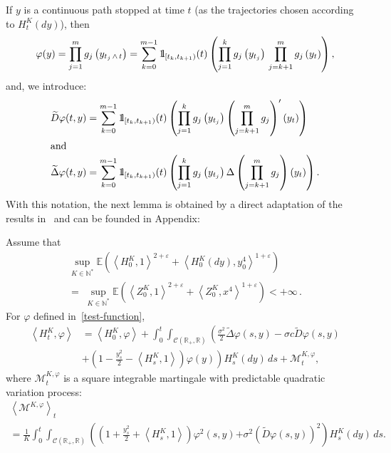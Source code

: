 \documentclass[AHL,Unicode,longabstracts,published]{cedram}
\newcommand{\Co}{\mathcal{C}}
\newcommand{\Mo}{\mathcal{M}}
\newcommand*\N{\mathbb{N}}
\newcommand*\R{\mathbb{R}}
\newcommand*\E{\mathbb{E}}
\newcommand*\ind{{\mathchoice {\rm 1\mskip-4mu l} {\rm 1\mskip-4mu l} {\rm 1\mskip-4.5mu l} {\rm 1\mskip-5mu l}}}
\begin{document}
If $y$ is a continuous path stopped at time $t$ (as the trajectories chosen according to $H^K_{t}(dy)$), then
\[
\varphi(y)=\prod_{j=1}^m g_{j}\left(y_{t_{j}\,\wedge\, t} \right) = \sum_{k=0}^{m-1}\ind_{\left[t_k, t_{k+1}\right)}(t)\left(\prod_{j=1}^k g_j\left(y_{t_j}\right) \, \prod_{j=k+1}^m g_j\left(y_t\right)\right),
\]
and, we introduce:
\begin{align}
\widetilde{D}\varphi(t,y) &= \sum_{k=0}^{m-1}\ind_{\left[t_k, t_{k+1}\right)}(t)\left(\prod_{j=1}^k g_j\left(y_{t_j}\right) \left(\prod_{j=k+1}^m g_j\right)'\left(y_t\right)\right)\label{derivee}
\\
\intertext{and}
\widetilde{\Delta}\varphi(t,y) &= \sum_{k=0}^{m-1}\ind_{\left[t_k, t_{k+1}\right)}(t)\left(\prod_{j=1}^k g_j\left(y_{t_j}\right) \Delta\left(\prod_{j=k+1}^m g_j\right)\left(y_t\right)\right).\label{laplacien}
\end{align}
With this notation, the next lemma is obtained by a direct adaptation of the results in~\cite{champagnatmeleard} and can be founded in Appendix:
\begin{lemm}\label{martingale}
Assume that
\begin{multline*}
\sup_{K \in \N^{\ast}}\E\left(\left\langle H^{K}_{0},1\right\rangle^{2+\varepsilon}+\left\langle H^K_0(dy),y_0^4\right\rangle^{1+\varepsilon}\right)\\
=\; \sup_{K \in \N^{\ast}}\E\left(\left\langle Z^{K}_{0},1\right\rangle^{2+\varepsilon}+\left\langle Z^K_0,x^4\right\rangle^{1+\varepsilon}\right)<+\infty\,.
\end{multline*}
For $\varphi$ defined in~\eqref{test-function},
\begin{equation}\label{martingalecasdawson}
\begin{split}
\left\langle H^K_t,\varphi\right\rangle
&= \left\langle H^K_0,\varphi\right\rangle
+ \int_0^t \int_{\Co\left(\R_+, \R\right)} \left(
\frac{\sigma^2}{2} \widetilde{\Delta}\varphi(s,y)-\sigma c \widetilde{D}\varphi(s,y)\right.\\
&+\left. \left(1- \frac{y_s^2}{2} - \left\langle H^K_s,1\right\rangle\right)\varphi(y)\right)H^K_s(dy)\, ds + \Mo^{K, \varphi}_t,
\end{split}
\end{equation}
where $\Mo^{K,\varphi}_t$ is a square integrable martingale with predictable quadratic variation process:
\begin{multline}\label{eq:crochet}
\left\langle \Mo^{K, \varphi}\right\rangle_t\\
= \frac{1}{K} \int_0^t \int_{\Co\left(\R_+, \R\right)} \left(\left(1+ \frac{y_s^2}{2} +\left\langle H^K_s,1\right\rangle\right)\varphi^2(s,y) { + \sigma^2 \left(\widetilde{D}\varphi(s,y)\right)^2}
\right) H^K_s(dy)\, ds.
\end{multline}
\end{lemm} 
\end{document}
